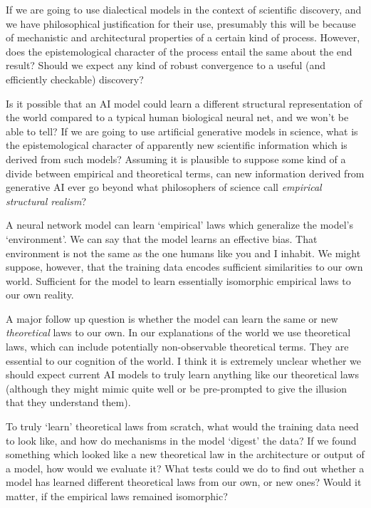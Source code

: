\documentclass[11pt, oneside]{article}   	%
\begin{document}
If we are going to use dialectical models in the context of scientific discovery, and we have philosophical justification for their use, presumably this will be because of mechanistic and architectural properties of a certain kind of process.  However, does the epistemological character of the process entail the same about the end result?  Should we expect any kind of robust convergence to a useful (and efficiently checkable) discovery?  








Is it possible that an AI model could learn a different structural representation of the world compared to a typical human biological neural net, and we won’t be able to tell?  If we are going to use artificial generative models in science, what is the epistemological character of apparently new scientific information which is derived from such models?  Assuming it is plausible to suppose some kind of a divide between empirical and theoretical terms, can new information derived from generative AI ever go beyond what philosophers of science call \emph{empirical structural realism}?

A neural network model can learn `empirical' laws which generalize the model's `environment'.  We can say that the model learns an effective bias. That environment is not the same as the one humans like you and I inhabit.   We might suppose, however, that the training data encodes sufficient similarities to our own world.  Sufficient for the model to learn essentially isomorphic empirical laws to our own reality.

A major follow up question is whether the model can learn the same or new \emph{theoretical} laws to our own.  In our explanations of the world we use theoretical laws, which can include potentially non-observable theoretical terms.  They are essential to our cognition of the world.  I think it is extremely unclear whether we should expect current AI models to truly learn anything like our theoretical laws (although they might mimic quite well or be pre-prompted to give the illusion that they understand them).  

To truly `learn' theoretical laws from scratch, what would the training data need to look like, and how do mechanisms in the model `digest' the data?  If we found something which looked like a new theoretical law in the architecture or output of a model, how would we evaluate it?  What tests could we do to find out whether a model has learned different theoretical laws from our own, or new ones?  Would it matter, if the empirical laws remained isomorphic?
\end{document}
